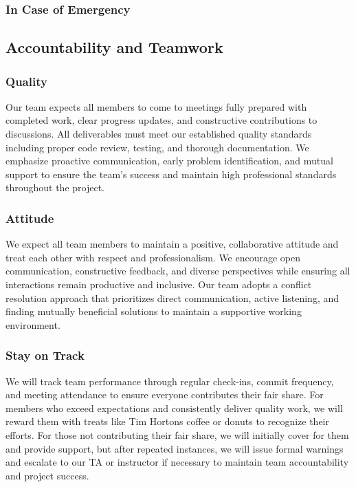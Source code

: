\documentclass{article}
\begin{document}
\subsubsection*{In Case of Emergency}


\subsection*{Accountability and Teamwork}

\subsubsection*{Quality} 

Our team expects all members to come to meetings fully prepared with completed work, 
clear progress updates, and constructive contributions to discussions.
All deliverables must meet our established quality standards including proper code review, testing, and thorough documentation. 
We emphasize proactive communication, early problem identification, and mutual support to ensure the team's success and maintain high 
professional standards throughout the project.

\subsubsection*{Attitude}

We expect all team members to maintain a positive, collaborative attitude and treat each other with respect and professionalism. 
We encourage open communication, constructive feedback, and diverse perspectives while ensuring all interactions remain productive and inclusive. 
Our team adopts a conflict resolution approach that prioritizes direct communication, active listening, and finding mutually beneficial solutions to 
maintain a supportive working environment.

\subsubsection*{Stay on Track}

We will track team performance through regular check-ins, commit frequency, and meeting attendance to ensure everyone contributes their fair share. 
For members who exceed expectations and consistently deliver quality work, we will reward them with treats like Tim Hortons coffee or donuts to recognize their efforts. 
For those not contributing their fair share, we will initially cover for them and provide support, but after repeated instances, we will issue formal warnings and escalate 
to our TA or instructor if necessary to maintain team accountability and project success.
\end{document}
